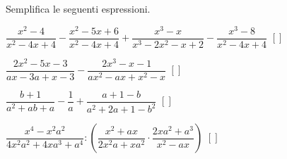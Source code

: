 \begin{esercizio}
Semplifica le seguenti espressioni.
\begin{enumeratea}
 \item \(\dfrac{x^{2}-4}{x^{2}-4x+4}-\dfrac{x^{2}-5x+6}{x^{2}-4x+4}+
        \dfrac{x^{3}-x}{x^{3}-2x^{2}-x+2}-\dfrac{x^{3}-8}{x^{2}-4x+4}\)
  \hfill \(\left[\right]\)
 \item \(\dfrac{2x^{2}-5x-3}{ax-3a+x-3}-\dfrac{2x^{3}-x-1}{ax^{2}-ax+x^{2}-x}\)
  \hfill \(\left[\right]\)
 \item \(\dfrac{b+1}{a^{2}+ab+a}-\dfrac{1}{a}+\dfrac{a+1-b}{a^{2}+2a+1-b^{2}}\)
  \hfill \(\left[\right]\)
 \item \(\dfrac{x^{4}-x^{2}a^{2}}{4x^{2}a^{2}+4xa^{3}+a^{4}}:
        \left(\dfrac{x^{2}+ax}{2x^{2}a+xa^{2}}\cdot
             {\dfrac{2xa^{2}+a^{3}}{x^{2}-ax}}\right)\)
  \hfill \(\left[\right]\)
\end{enumeratea}
\end{esercizio}

